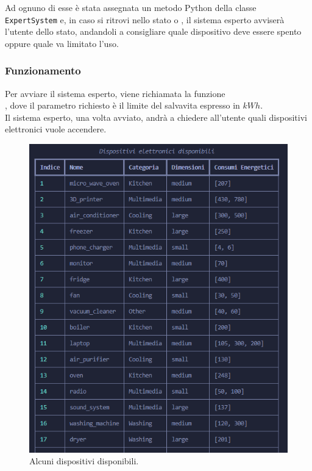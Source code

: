 \documentclass[12pt, letterpaper]{article}
\begin{document}
\noindent Ad ognuno di esse è stata assegnata un metodo Python della classe \\
\texttt{ExpertSystem} e, in caso si ritrovi nello stato  o , il sistema esperto avviserà l'utente
dello stato, andandoli a consigliare quale dispositivo deve essere spento oppure quale va limitato l'uso.

\subsubsection{Funzionamento}

\noindent Per avviare il sistema esperto, viene richiamata la funzione \\
, dove il parametro richiesto è il limite del salvavita espresso in $kWh$. \\

\noindent Il sistema esperto, una volta avviato, andrà a chiedere all'utente quali dispositivi elettronici vuole
accendere.

\begin{figure}[h]
      \centering
      \includegraphics[scale=0.8]{dispositivi-tabella.png}
      \caption{Alcuni dispositivi disponibili.}
\end{figure}
\end{document}
